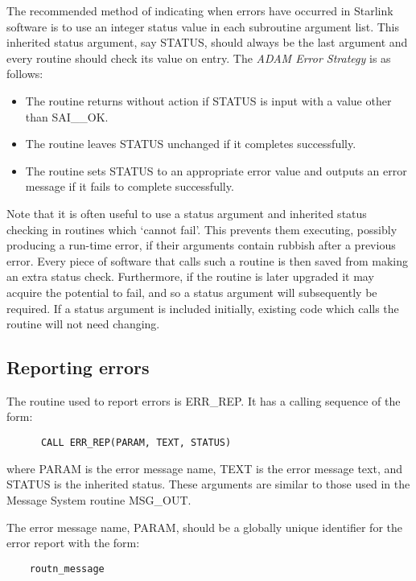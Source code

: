 The recommended method of indicating when errors have occurred in Starlink
software is to use an integer status value in each subroutine argument list.
This inherited status argument, say STATUS, should always be the last argument
and every routine should check its value on entry.
The {\em ADAM Error Strategy} is as follows:
\begin {itemize}
\item The routine returns without action if STATUS is input with a value
 other than SAI\_\_OK.
\item The routine leaves STATUS unchanged if it completes successfully.
\item The routine sets STATUS to an appropriate error value and outputs an
 error message if it fails to complete successfully.
\end {itemize}
Note that it is often useful to use a status argument and inherited status
checking in routines which `cannot fail'.
This prevents them executing, possibly producing a run-time error, if their
arguments contain rubbish after a previous error.
Every piece of software that calls such a routine is then saved from making
an extra status check.
Furthermore, if the routine is later upgraded it may acquire the potential
to fail, and so a status argument will subsequently be required.
If a status argument is included initially, existing code which calls
the routine will not need changing.

\subsection {Reporting errors}

The routine used to report errors is ERR\_REP.
It has a calling sequence of the form:

\begin{small}
\begin{verbatim}
      CALL ERR_REP(PARAM, TEXT, STATUS)
\end{verbatim}
\end{small}

where PARAM is the error message name, TEXT is the error message text, and
STATUS is the inherited status.
These arguments are similar to those used in the Message System routine
MSG\_OUT.

The error message name, PARAM, should be a globally unique identifier for the
error report with the form:

\begin{small}
\begin{verbatim}
    routn_message
\end{verbatim}
\end{small}

